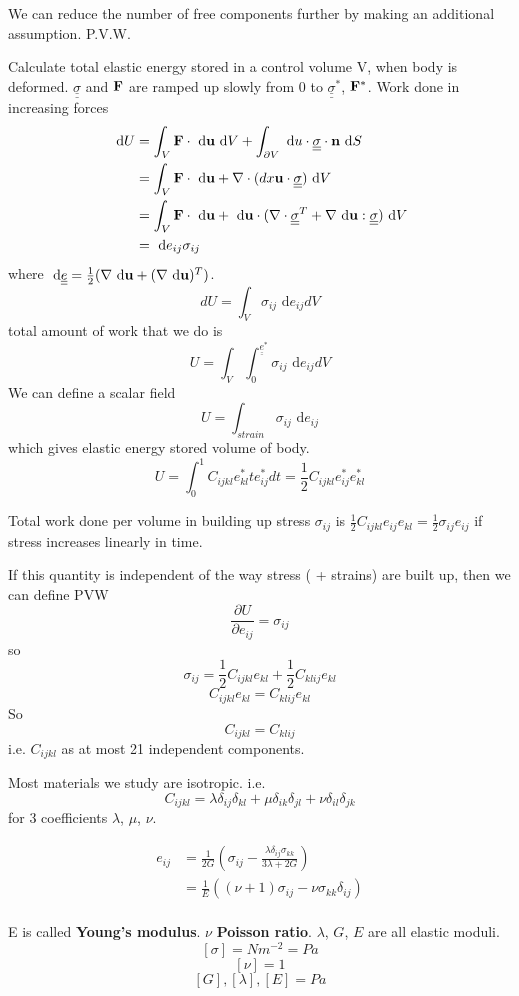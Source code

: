 \documentclass[12pt]{article}
\newcommand{\nn}{{\bf n}}
\newcommand{\uu}{{\bf u}}
\newcommand{\FF}{{\bf F}}
\newcommand{\ssigma}{{\underline{\underline \sigma}}}
\newcommand{\te}{{\underline{\underline e}}}
\newcommand{\dx}[1]{\text{ d}#1}
\begin{document}
We can reduce the number of free components further by making an additional assumption. P.V.W.

Calculate total elastic energy stored in a control volume V, when body is deformed. $\ssigma$ and $\FF$ are ramped up slowly from 0 to $\ssigma^*$, $\FF^*$. Work done in increasing forces 
\begin{align*}
\dx{U} &= \int_V \FF\cdot\dx{\uu} \dx{V} + \int_{\partial V} \dx{u}\cdot \ssigma\cdot\nn\dx{S}\\
&= \int_V \FF\cdot\dx{\uu} + \nabla\cdot (dx{\uu}\cdot \ssigma) \dx{V} \\
&= \int_V \FF\cdot\dx{\uu} + \dx{\uu}\cdot(\nabla\cdot\ssigma^T + \nabla\dx{\uu}:\ssigma)\dx{V}\\
&= \dx{e_{ij}}\sigma_{ij} 
\end{align*}
where $\dx{\te} = \frac 1 2 (\nabla\dx{\uu} + (\nabla\dx{\uu} )^T)$.
\[
dU = \int_V\sigma_{ij}\dx{e_{ij}}dV
\]
total amount of work that we do is 
\[
U = \int_V\int_0^{\te^*}\sigma_{ij}\dx{e_{ij}}dV
\]
We can define a scalar field 
\[
U = \int_{strain} \sigma_{ij}\dx{e_{ij}}
\]
which gives elastic energy stored volume of body.
\[
U = \int_0^1C_{ijkl}e_{kl}^*te_{ij}^*dt = \frac 1 2 C_{ijkl}e_{ij}^*e_{kl}^*
\]

Total work done per volume in building up stress $\sigma_{ij}$ is $\frac 1 2 C_{ijkl}e_{ij}e_{kl} = \frac 1 2 \sigma_{ij}e_{ij}$ if stress increases linearly in time.

If this quantity is independent of the way stress ( + strains) are built up, then we can define PVW
\[
\frac{\partial U}{\partial e_{ij}} = \sigma_{ij}
\]
so
\[
\sigma_{ij} = \frac 1 2 C_{ijkl}e_{kl} + \frac 1 2 C_{klij}e_{kl}
\]
\[
C_{ijkl}e_{kl} = C_{klij}e_{kl}
\]
So
\[
C_{ijkl} = C_{klij}
\]
i.e. $C_{ijkl}$ as at most 21 independent components.

Most materials we study are isotropic. i.e.
\[
C_{ijkl} = \lambda \delta_{ij}\delta_{kl} + \mu \delta_{ik}\delta_{jl}  + \nu \delta_{il}\delta_{jk}
\]
for 3 coefficients $\lambda$, $\mu$, $\nu$.



\begin{align*}
e_{ij} &= \frac{1}{2G} (\sigma_{ij} - \frac{\lambda\delta_{ij}\sigma_{kk}}{3\lambda+ 2 G})\\
	&= \frac1 E ((\nu+1)\sigma_{ij} -\nu \sigma_{kk}\delta_{ij})\\
\end{align*}

E is called {\bf Young's modulus}.
$\nu$ {\bf Poisson ratio}.
$\lambda$, $G$, $E$ are all elastic moduli.
\[
[\sigma] = Nm^{-2} = Pa
\]
\[
[\nu] = 1
\]
\[
[G], [\lambda], [E]= Pa
\]
\end{document}
